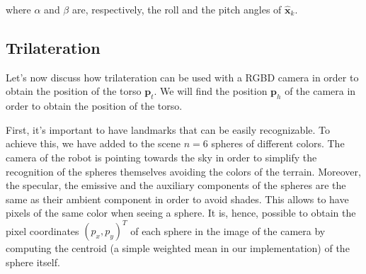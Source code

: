 \documentclass[a4paper]{article}
\begin{document}


\noindent where $\alpha$ and $\beta$ are, respectively,
the roll and the pitch angles of $\bm{\hat{x}}_{k}$.

\subsection{Trilateration}
\label{subsec:trilateration}
Let's now discuss how
trilateration\cite{trilateration-hereman-1995} can be used with
a RGBD camera in order to obtain the position of the torso
$\bm{p}_t$. We will find the position $\bm{p}_h$ of the camera
in order to obtain the position of the torso.

First, it's important to have landmarks that can be
easily recognizable. To achieve this, we have added to the scene
$n=6$ spheres of different colors. The camera of the robot is
pointing towards the
sky in order to simplify the recognition of the spheres
themselves avoiding the colors of the terrain.
Moreover, the specular, the emissive and the auxiliary
components of the spheres are the same as their ambient component
in order to avoid shades. This allows to have pixels of the same
color when seeing a sphere. It is, hence, possible to obtain
the pixel coordinates $(p_x, p_y)^T$ of each sphere in the image
of the camera by computing the centroid (a simple weighted mean
in our implementation) of the sphere itself.
\end{document}

